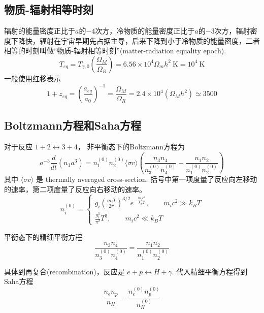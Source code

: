 \documentclass[12pt]{ctexart}
\begin{document}
\subsection*{物质-辐射相等时刻}
辐射的能量密度正比于$a$的$-4$次方，冷物质的能量密度正比于$a$的$-3$次方，辐射密度下降快，辐射在宇宙早期先占据主导，后来下降到小于冷物质的能量密度，二者相等的时刻叫做“物质-辐射相等时刻”(matter-radiation equality epoch).
\begin{equation}
    T_{eq}=T_{\gamma,0}\left(\frac{\Omega_{M}}{\Omega_{R}}\right)=6.56 \times 10^{4} \Omega_{m} h^{2} \mathrm{~K} =10^{4} \mathrm{~K}
\end{equation}
一般使用红移表示
\begin{equation}
    1+z_{eq}=\left(\frac{a_{e q}}{a_{0}}\right)^{-1}=\frac{\Omega_{M}}{\Omega_{R}}=2.4 \times 10^{4}\left(\Omega_M h^{2}\right) \simeq 3500
\end{equation}

\subsection*{Boltzmann方程和Saha方程}
对于反应 $1+2 \longleftrightarrow 3+4$，
非平衡态下的Boltzmann方程为
\begin{equation}
    a^{-3} \frac{d}{d t}\left(n_{1} a^{3}\right)=n_{1}^{(0)} n_{2}^{(0)}\langle\sigma v\rangle\left(\frac{n_{3} n_{4}}{n_{3}^{(0)} n_{4}^{(0)}}-\frac{n_{1} n_{2}}{n_{1}^{(0)} n_{2}^{(0)}}\right)
\end{equation}
其中 $\langle\sigma v\rangle$ 是 thermally averaged cross-section. 括号中第一项度量了反应向左移动的速率，第二项度量了反应向右移动的速率。
\begin{equation}
    n_{i}^{(0)}=\left\{\begin{array}{l}
    g_{i}\left(\frac{m_i T}{2 \pi}\right)^{3 / 2} e^{-\frac{m_{i} c^{2}}{k_{B} T}  }, \qquad m_{i} c^{2}\gg k_{B} T \\
    \frac{g_{i}^{3}}{\pi^{2}}T^3, \qquad m_{i} c^{2}\ll k_{B} T 
    \end{array}\right.
\end{equation}

平衡态下的精细平衡方程
\begin{equation}
    \frac{n_{3} n_{4}}{n_{3}^{(0)} n_{4}^{(0)}}=\frac{n_{1} n_{2}}{n_{1}^{(0)} n_{2}^{(0)}}
\end{equation}

具体到再复合(recombination)，反应是 $e+p \leftrightarrow H+\gamma$.
代入精细平衡方程得到Saha方程
\begin{equation}
    \frac{n_{e}n_p}{n_{H}}=\frac{n_{e}^{(0)} n_{p}^{(0)}}{n_{H}^{(0)}}
\end{equation}
\end{document}
